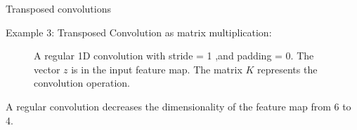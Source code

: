 \begin{vbframe}{Transposed convolutions}
\framebreak 

Example 3: Transposed Convolution as matrix multiplication:
\begin{figure}
\centering
{}
\caption{A regular 1D convolution with  stride = 1 ,and padding = 0. The vector $z$ is in the input feature map. The matrix $K$ represents the convolution operation.}
\end{figure}
  A regular convolution decreases the dimensionality of the feature map from 6 to 4.\\
\end{vbframe}

